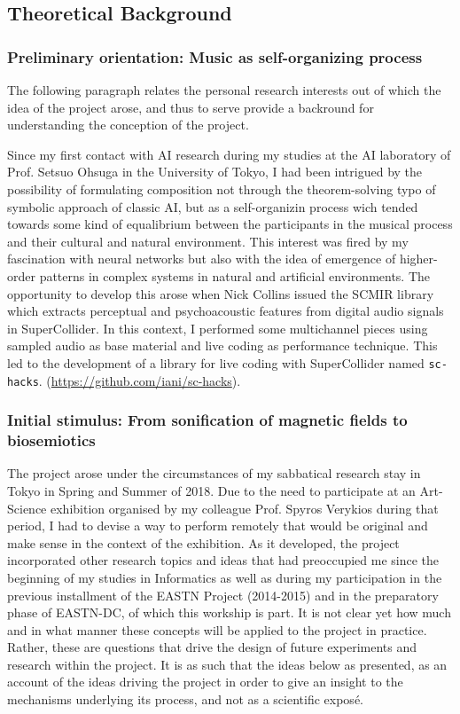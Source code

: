 \documentclass[11pt]{article}
\begin{document}
\subsection{Theoretical Background}
\label{sec:orgea0c014}

\subsubsection{Preliminary orientation: Music as self-organizing process}
\label{sec:orge8e6794}

The following paragraph relates the personal research interests out of which the idea of the project arose, and thus to serve provide a backround for understanding the conception of the project. 

Since my first contact with AI research during my studies at the AI laboratory of Prof. Setsuo Ohsuga in the University of Tokyo, I had been intrigued by the possibility of formulating composition not through the theorem-solving typo of symbolic approach of classic AI, but as a self-organizin process wich tended towards some kind of equalibrium between the participants in the musical process and their cultural and natural environment. This interest was fired by my fascination with neural networks but also with the idea of emergence of higher-order patterns in complex systems in natural and artificial environments. The opportunity to develop this arose when Nick Collins issued the SCMIR library which extracts perceptual and psychoacoustic features from digital audio signals in SuperCollider.  In this context, I performed some multichannel pieces using sampled audio as base material and live coding as performance technique.  This led to the development of a library for live coding with SuperCollider named \texttt{sc-hacks}.  (\url{https://github.com/iani/sc-hacks}). 

\subsubsection{Initial stimulus: From sonification of magnetic fields to biosemiotics}
\label{sec:org097798a}

The project arose under the circumstances of my sabbatical research stay in Tokyo in Spring and Summer of 2018.  Due to the need to participate at an Art-Science exhibition organised by my colleague Prof. Spyros Verykios during that period, I had to devise a way to perform remotely that would be original and make sense in the context of the exhibition. As it developed, the project incorporated other research topics and ideas that had preoccupied me since the beginning of my studies in Informatics as well as during my participation in the previous installment of the EASTN Project (2014-2015) and in the preparatory phase of EASTN-DC, of which this workship is part.  It is not clear yet how much and in what manner these concepts will be applied to the project in practice.  Rather, these are questions that drive the design of future experiments and research within the project.  It is as such that the ideas below as presented, as an account of the ideas driving the project in order to give an insight to the mechanisms underlying its process, and not as a scientific exposé.
\end{document}
